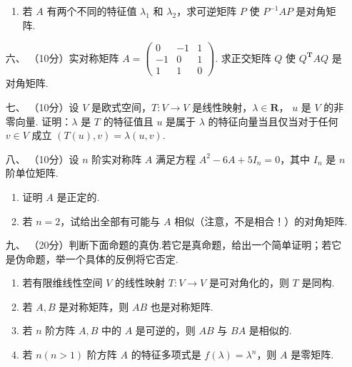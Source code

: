 \begin{enumerate}
\begin{enumerate}[label=(\arabic*)]
        \item 若 $A$ 有两个不同的特征值 $\lambda_1$ 和 $\lambda_2$，求可逆矩阵 $P$ 使 $P^{-1}AP$ 是对角矩阵.
    \end{enumerate}
    \item [六、]（10分）实对称矩阵 $A=\begin{pmatrix}0 & -1 & 1 \\ -1 & 0 & 1 \\ 1 & 1 & 0\end{pmatrix}.$ 求正交矩阵 $Q$ 使 $Q^\mathbf{T}AQ$ 是对角矩阵.
    \item [七、]（10分）设 $V$ 是欧式空间，$T:V\to V$ 是线性映射，$\lambda \in \mathbf{R}$， $u$ 是 $V$ 的非零向量.
    证明：$\lambda$ 是 $T$ 的特征值且 $u$ 是属于 $\lambda$ 的特征向量当且仅当对于任何 $v\in V$ 成立 $(T(u),v) = \lambda(u,v).$
    \item [八、]（10分）设 $n$ 阶实对称阵 $A$ 满足方程 $A^2-6A+5I_n=0$，其中 $I_n$ 是 $n$ 阶单位矩阵.
    \begin{enumerate}[label=(\arabic*)]
        \item 证明 $A$ 是正定的.
        \item 若 $n=2$，试给出全部有可能与 $A$ 相似（注意，不是相合！）的对角矩阵.
    \end{enumerate}
    \item [九、]（20分）判断下面命题的真伪.若它是真命题，给出一个简单证明；若它是伪命题，举一个具体的反例将它否定.
    \begin{enumerate}[label=(\arabic*)]
        \item 若有限维线性空间 $V$ 的线性映射 $T:V \to V$ 是可对角化的，则 $T$ 是同构.
        \item 若 $A,B$ 是对称矩阵，则 $AB$ 也是对称矩阵.
        \item 若 $n$ 阶方阵 $A,B$ 中的 $A$ 是可逆的，则 $AB$ 与 $BA$ 是相似的.
        \item 若 $n(n>1)$ 阶方阵 $A$ 的特征多项式是 $f(\lambda)=\lambda^n$，则 $A$ 是零矩阵.
    \end{enumerate}
\end{enumerate}

\clearpage

